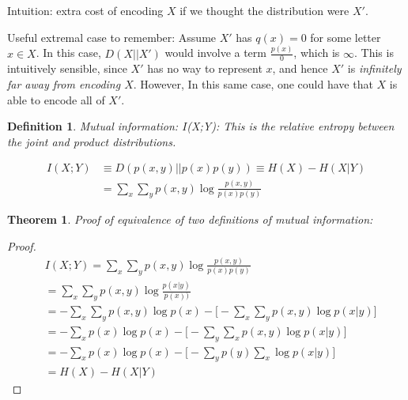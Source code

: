 \documentclass[11pt]{book}
\renewcommand{\H}{\ensuremath{H}}
\newcommand{\KL}[2]{\ensuremath{D(#1 || #2)}}
\newcommand{\I}{\ensuremath{I}}
\newtheorem{theorem}{Theorem}
\newtheorem{definition}{Definition}
\newtheorem{proof}{Proof}
\begin{document}
Intuition: extra cost of encoding $X$ if we thought the distribution were $X'$.

Useful extremal case to remember: Assume $X'$ has $q(x) = 0$ for some
letter $x \in X$. In this case, $\KL{X}{X'}$ would involve a term $\frac{p(x)}{0}$,
which is $\infty$. This is intuitively sensible, since $X'$ has no way to represent
$x$, and hence $X'$ is \textit{infinitely far away from encoding $X$}. However,
In this same case, one could have that $X$ is able to encode all of $X'$.

\begin{definition}
    Mutual information: \I(X;Y): This is the relative entropy between the
    joint and product distributions.

    \begin{align*}
        \I(X;Y) &\equiv \KL{p(x, y)}{p(x)p(y)} \equiv H(X) - H(X|Y) \\
                &= \sum_x \sum_y p(x, y) \log \frac{p(x, y)}{p(x)p(y)}
    \end{align*}
    
\end{definition}

\begin{theorem}
    Proof of equivalence of two definitions of mutual information:
\end{theorem}
\begin{proof}
    \begin{align*}
        &\I(X;Y)  = \sum_x \sum_y p(x, y) \log \frac{p(x, y)}{p(x)p(y)} \\
        &= \sum_x \sum_y p(x, y) \log \frac{p(x|y)}{p(x))} \\
        &= - \sum_x \sum_y p(x, y) \log p(x) - \big[ - \sum_x \sum_y p(x, y) \log p(x|y) \big] \\
        &= - \sum_x p(x) \log p(x) - \big[ - \sum_y \sum_x p(x, y) \log p(x|y) \big] \\
        &= - \sum_x p(x) \log p(x) - \big[ - \sum_y p(y) \sum_x \log p(x|y) \big] \\
        &= \H(X) - H(X|Y)
    \end{align*}
\end{proof}
\end{document}

